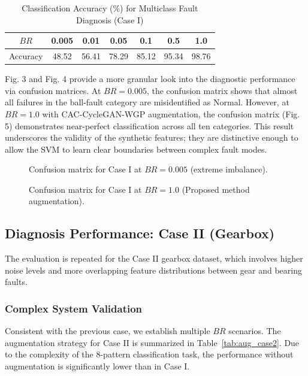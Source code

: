 \begin{table}[htbp]
\centering
\caption{Classification Accuracy (\%) for Multiclass Fault Diagnosis (Case I)}
\label{tab:acc_case1}
\begin{tabular}{ccccccc}
\hline
$BR$ & 0.005 & 0.01 & 0.05 & 0.1 & 0.5 & 1.0 \\ \hline
Accuracy & 48.52 & 56.41 & 78.29 & 85.12 & 95.34 & 98.76 \\
\hline
\end{tabular}
\end{table}

Fig. 3 and Fig. 4 provide a more granular look into the diagnostic performance via confusion matrices. At $BR=0.005$, the confusion matrix shows that almost all failures in the ball-fault category are misidentified as Normal. However, at $BR=1.0$ with CAC-CycleGAN-WGP augmentation, the confusion matrix (Fig. 5) demonstrates near-perfect classification across all ten categories. This result underscores the validity of the synthetic features; they are distinctive enough to allow the SVM to learn clear boundaries between complex fault modes.

\begin{figure}[htbp]
\centering
\caption{Confusion matrix for Case I at $BR=0.005$ (extreme imbalance).}
\end{figure}

\begin{figure}[htbp]
\centering
\caption{Confusion matrix for Case I at $BR=1.0$ (Proposed method augmentation).}
\end{figure}

\subsection{Diagnosis Performance: Case II (Gearbox)}
The evaluation is repeated for the Case II gearbox dataset, which involves higher noise levels and more overlapping feature distributions between gear and bearing faults.

\subsubsection{Complex System Validation}
Consistent with the previous case, we establish multiple $BR$ scenarios. The augmentation strategy for Case II is summarized in Table~\ref{tab:aug_case2}. Due to the complexity of the 8-pattern classification task, the performance without augmentation is significantly lower than in Case I.

